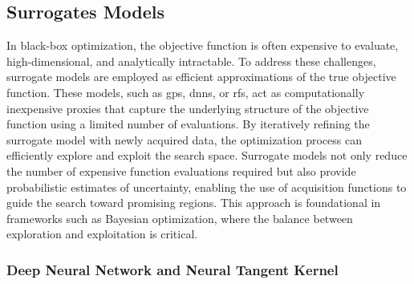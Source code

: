 


\subsection{Surrogates Models}
In black-box optimization, the objective function is often expensive to evaluate, high-dimensional, and analytically intractable. To address these challenges, surrogate models are employed as efficient approximations of the true objective function. These models, such as \acfp{gp}, \acfp{dnn}, or \acfp{rf}, act as computationally inexpensive proxies that capture the underlying structure of the objective function using a limited number of evaluations. By iteratively refining the surrogate model with newly acquired data, the optimization process can efficiently explore and exploit the search space. Surrogate models not only reduce the number of expensive function evaluations required but also provide probabilistic estimates of uncertainty, enabling the use of acquisition functions to guide the search toward promising regions. This approach is foundational in frameworks such as Bayesian optimization, where the balance between exploration and exploitation is critical.



\subsubsection{Deep Neural Network and Neural Tangent Kernel}
\label{background:ntk}

